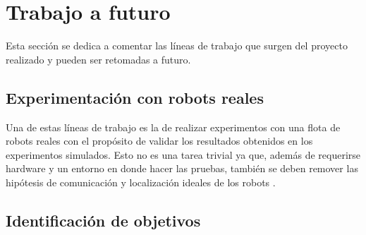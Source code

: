 







\section{Trabajo a futuro}

Esta sección se dedica a comentar las líneas de trabajo que surgen del proyecto
realizado y pueden ser retomadas a futuro.

\subsection{Experimentación con robots reales}
Una de estas líneas de trabajo es la de realizar experimentos con una flota de
robots reales con el propósito de validar los resultados obtenidos en los
experimentos simulados. Esto no es una tarea trivial ya que, además de
requerirse hardware y un entorno en donde hacer las pruebas, también se deben
remover las hipótesis de comunicación y localización ideales de los robots
\cite{amigoni2017multirobot,slam}.

\subsection{Identificación de objetivos}

